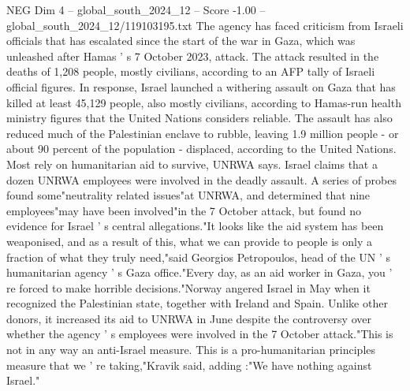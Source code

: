 \begin{textsample}{NEG Dim 4 – global\_south\_2024\_12 – Score -1.00 – global\_south\_2024\_12/119103195.txt}
The agency has faced criticism from Israeli officials that has escalated since the start of the war in Gaza, which was unleashed after Hamas ' s 7 October 2023, attack.
The attack resulted in the deaths of 1,208 people, mostly civilians, according to an AFP tally of Israeli official figures.
In response, Israel launched a withering assault on Gaza that has killed at least 45,129 people, also mostly civilians, according to Hamas-run health ministry figures that the United Nations considers reliable.
The assault has also reduced much of the Palestinian enclave to rubble, leaving 1.9 million people - or about 90 percent of the population - displaced, according to the United Nations.
Most rely on humanitarian aid to survive, UNRWA says.
Israel claims that a dozen UNRWA employees were involved in the deadly assault.
A series of probes found some"neutrality related issues"at UNRWA, and determined that nine employees"may have been involved"in the 7 October attack, but found no evidence for Israel ' s central allegations."It looks like the aid system has been weaponised, and as a result of this, what we can provide to people is only a fraction of what they truly need,"said Georgios Petropoulos, head of the UN ' s humanitarian agency ' s Gaza office."Every day, as an aid worker in Gaza, you ' re forced to make horrible decisions."Norway angered Israel in May when it recognized the Palestinian state, together with Ireland and Spain.
Unlike other donors, it increased its aid to UNRWA in June despite the controversy over whether the agency ' s employees were involved in the 7 October attack."This is not in any way an anti-Israel measure.
This is a pro-humanitarian principles measure that we ' re taking,"Kravik said, adding :"We have nothing against Israel."

\end{textsample}
